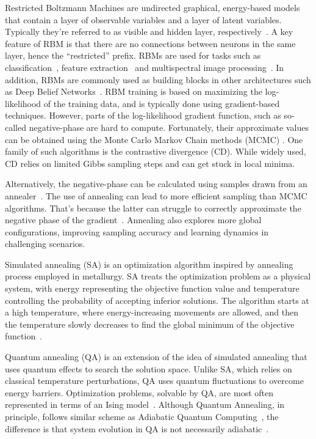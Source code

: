 \documentclass[runningheads]{llncs}
\begin{document}
Restricted Boltzmann Machines are undirected graphical, energy-based models that
contain a layer of observable variables and a layer of latent variables.
Typically they're referred to as visible and hidden layer,
respectively~\cite{Goodfellow2016}.%
A key feature of RBM is that
there are no connections between neurons in the same layer, hence the
``restricted'' prefix. RBMs are used for tasks such as
classification~\cite{Koziol2014}, feature extraction~\cite{Li2019} and
multispectral image processing~\cite{QBM4EO}. In addition, RBMs are commonly
used as building blocks in other architectures such as Deep Belief
Networks~\cite{Li2019, Goodfellow2016}. RBM training is based on maximizing the
log-likelihood of the training data, and is typically done using gradient-based
techniques. However, parts of the log-likelihood gradient function, such as
so-called negative-phase \cite{Dixit2021RBM_DWave} are hard to compute.
Fortunately, their approximate values can be obtained using the Monte Carlo
Markov Chain methods (MCMC) \cite{Goodfellow2016}. One family of such algorithms
is the contrastive divergence (CD). While widely used, CD relies on limited
Gibbs sampling steps and can get stuck in local minima. 

Alternatively, the negative-phase can be calculated using samples drawn from an
annealer~\cite{Dixit2021RBM_DWave}. The use of annealing can lead to more
efficient sampling than MCMC algorithms. That's because the latter can struggle
to correctly approximate the negative phase of the
gradient~\cite{Goodfellow2016}. Annealing also explores more global
configurations, improving sampling accuracy and learning dynamics in challenging
scenarios.

Simulated annealing (SA) is an optimization algorithm inspired by annealing
process employed in metallurgy. SA treats the optimization problem as a physical
system, with energy representing the objective function value and temperature
controlling the probability of accepting inferior solutions. The algorithm
starts at a high temperature, where energy-increasing movements are allowed, and
then the temperature slowly decreases to find the global minimum of the
objective function~\cite{Benedetti2021}.

Quantum annealing (QA) is an extension of the idea of simulated annealing that
uses quantum effects to search the solution space. Unlike SA, which relies on
classical temperature perturbations, QA uses quantum fluctuations to overcome
energy barriers. Optimization problems, solvable by QA, are most often
represented in terms of an Ising model~\cite{Kadowaki1998}. Although Quantum
Annealing, in principle, follows similar scheme as Adiabatic Quantum
Computing~\cite{Farhi2000}, the difference is that system evolution in QA is not
necessarily adiabatic~\cite{Vinci2017}.
\end{document}
